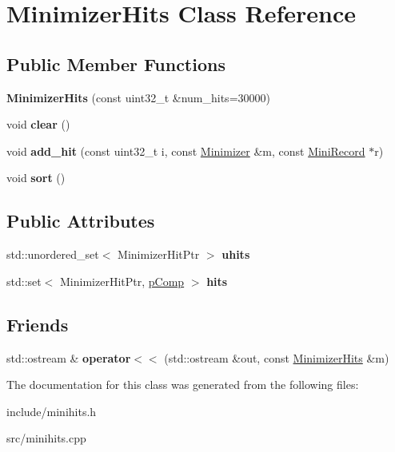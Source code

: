 \hypertarget{classMinimizerHits}{}\section{Minimizer\+Hits Class Reference}
\label{classMinimizerHits}
\subsection*{Public Member Functions}
\begin{DoxyCompactItemize}
\item 
\mbox{\label{classMinimizerHits_a7eb7b8fc345f22900966dd3063f672f0}} 
{\bfseries Minimizer\+Hits} (const uint32\+\_\+t \&num\+\_\+hits=30000)
\item 
\mbox{\label{classMinimizerHits_ac37a6dea43f610d2c2f938979128b7ad}} 
void {\bfseries clear} ()
\item 
\mbox{\label{classMinimizerHits_a086b03a37004125711335a4f1f4bb250}} 
void {\bfseries add\+\_\+hit} (const uint32\+\_\+t i, const \hyperlink{structMinimizer}{Minimizer} \&m, const \hyperlink{structMiniRecord}{Mini\+Record} $\ast$r)
\item 
\mbox{\label{classMinimizerHits_a258cf9fca5922ced1d278e88650502db}} 
void {\bfseries sort} ()
\end{DoxyCompactItemize}
\subsection*{Public Attributes}
\begin{DoxyCompactItemize}
\item 
\mbox{\label{classMinimizerHits_a496389f6989e628b660448644bc1728a}} 
std\+::unordered\+\_\+set$<$ Minimizer\+Hit\+Ptr $>$ {\bfseries uhits}
\item 
\mbox{\label{classMinimizerHits_aa3724c783e03e19c37851e458f36f205}} 
std\+::set$<$ Minimizer\+Hit\+Ptr, \hyperlink{structpComp}{p\+Comp} $>$ {\bfseries hits}
\end{DoxyCompactItemize}
\subsection*{Friends}
\begin{DoxyCompactItemize}
\item 
\mbox{\label{classMinimizerHits_a909db7b6fd1771335ed163db5d65d583}} 
std\+::ostream \& {\bfseries operator$<$$<$} (std\+::ostream \&out, const \hyperlink{classMinimizerHits}{Minimizer\+Hits} \&m)
\end{DoxyCompactItemize}


The documentation for this class was generated from the following files\+:\begin{DoxyCompactItemize}
\item 
include/minihits.\+h\item 
src/minihits.\+cpp\end{DoxyCompactItemize}
